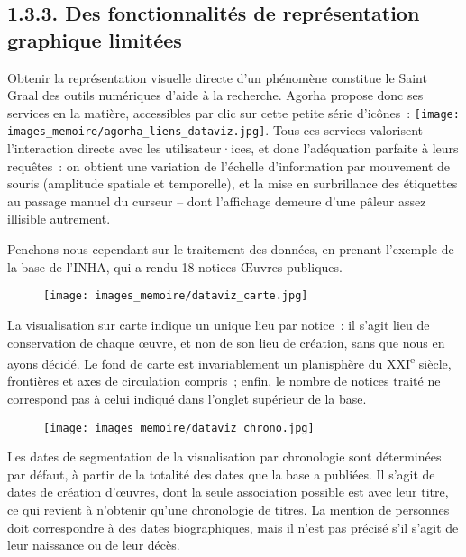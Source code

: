 \documentclass[a4paper,12pt, twoside]{book}
\begin{document}
\subsection*{1.3.3. Des fonctionnalités de représentation graphique limitées}

Obtenir la représentation visuelle directe d’un phénomène constitue le Saint Graal des outils numériques d’aide à la recherche. Agorha propose donc ses services en la matière, accessibles par clic sur cette petite série d’icônes~: \texttt{[image: images\_memoire/agorha\_liens\_dataviz.jpg]}.
Tous ces services valorisent l’interaction directe avec les utilisateur·ices, et donc l’adéquation parfaite à leurs requêtes~: on obtient une variation de l’échelle d’information par mouvement de souris (amplitude spatiale et temporelle), et la mise en surbrillance des étiquettes au passage manuel du curseur – dont l’affichage demeure d’une pâleur assez illisible autrement.

Penchons-nous cependant sur le traitement des données, en prenant l’exemple de la base de l’INHA, qui a rendu 18 notices \textsf{Œuvres} publiques.

\begin{figure}[!h]
    \centering
    \texttt{[image: images\_memoire/dataviz\_carte.jpg]}
    \label{Une cartographie faite par Agorha}
\end{figure}

La visualisation sur carte indique un unique lieu par notice~: il s’agit lieu de conservation de chaque œuvre, et non de son lieu de création, sans que nous en ayons décidé. Le fond de carte est invariablement un planisphère du XXI\textsuperscript{e} siècle, frontières et axes de circulation compris~; enfin, le nombre de notices traité ne correspond pas à celui indiqué dans l’onglet supérieur de la base.

\begin{figure}[!h]
    \centering
    \texttt{[image: images\_memoire/dataviz\_chrono.jpg]}
    \label{Une chronologie faite par Agorha}
\end{figure}

Les dates de segmentation de la visualisation par chronologie sont déterminées par défaut, à partir de la totalité des dates que la base a publiées. Il s’agit de dates de création d’œuvres, dont la seule association possible est avec leur titre, ce qui revient à n’obtenir qu’une chronologie de titres. La mention de personnes doit correspondre à des dates biographiques, mais il n’est pas précisé s’il s’agit de leur naissance ou de leur décès.
\end{document}
